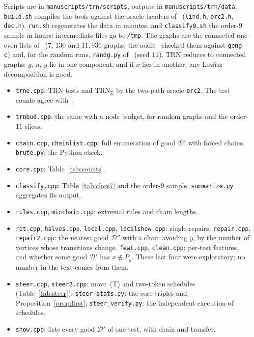 \documentclass[11pt]{amsart}
\theoremstyle{definition}
\newcommand{\cD}{\mathcal D}
\newcommand{\TRN}{\mathrm{TRN}}
\newcommand{\TRNE}{\mathrm{TRN}_{\mathrm E}}
\begin{document}
Scripts are in \texttt{manuscripts/trn/scripts}, outputs in \texttt{manuscripts/trn/data}.
\texttt{build.sh} compiles the tools against the oracle headers of~\cite{L1I}
(\texttt{lind.h}, \texttt{orc2.h}, \texttt{dec.h}). \texttt{run.sh} regenerates the data in
minutes, and \texttt{classify9.sh} the order-$9$ sample in hours; intermediate files go to
\texttt{/tmp}. The graphs are the connected one-even lists of~\cite{STL} ($7$, $130$ and $11{,}936$
graphs; the audit~\cite{A34} checked them against \texttt{geng -c}) and, for the random runs,
\texttt{randg.py} of~\cite{L1I} (seed $11$). $\TRN$ reduces to connected graphs: $g$, $u$, $y$ lie in
one component, and if $x$ lies in another, any Lov\'asz decomposition is good.
\begin{itemize}
\item \texttt{trne.cpp}: $\TRN$ tests and $\TRNE$ by the two-path oracle \texttt{orc2}. The test
counts agree with~\cite{CN}.
\item \texttt{trnbud.cpp}: the same with a node budget, for random graphs and the order-$11$ slices.
\item \texttt{chain.cpp}, \texttt{chainlist.cpp}: full enumeration of good $\cD'$ with forced
chains. \texttt{brute.py}: the Python check.
\item \texttt{core.cpp}: Table~\ref{tab:counts}.
\item \texttt{classify.cpp}: Table~\ref{tab:class7} and the order-$9$ sample; \texttt{summarize.py}
aggregates its output.
\item \texttt{rules.cpp}, \texttt{minchain.cpp}: extremal rules and chain lengths.
\item \texttt{rot.cpp}, \texttt{halves.cpp}, \texttt{local.cpp}, \texttt{localshow.cpp}: single
repairs. \texttt{repair.cpp}, \texttt{repair2.cpp}: the nearest good $\cD''$ with a chain avoiding
$y$, by the number of vertices whose transitions change. \texttt{feat.cpp}, \texttt{clean.cpp}:
per-test features, and whether some good $\cD'$ has $x\notin P_y$. These last four were exploratory;
no number in the text comes from them.
\item \texttt{steer.cpp}, \texttt{steer2.cpp}: move~(T) and two-token schedules
(Table~\ref{tab:steer}); \texttt{steer\_stats.py}: the core triples and
Proposition~\ref{prop:first}; \texttt{steer\_verify.py}: the independent execution of schedules.
\item \texttt{show.cpp}: lists every good $\cD'$ of one test, with chain and transfer.
\end{itemize}
\end{document}
